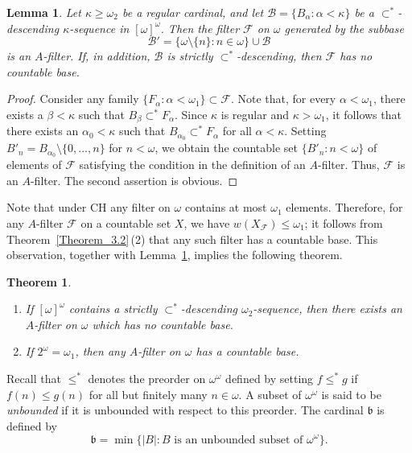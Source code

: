 \documentclass[a4paper,12pt]{amsart}
\newtheorem{theorem}{Theorem}[section]
\newtheorem{lemma}{Lemma}[section]
\theoremstyle{definition}
\theoremstyle{remark}
\begin{document}
\begin{lemma}
\label{Lemma_4.1}
Let $\kappa\ge \omega_2$ be a regular cardinal, and let $\mathscr B=\{B_\alpha: \alpha<\kappa\}$ 
be a $\subset^*$-descending $\kappa$-sequence in $[\omega]^\omega$. Then the filter $\mathscr F$ on 
$\omega$ generated by the subbase 
$$ 
\mathscr B' = \{\omega \setminus \{n\}: n\in\omega\}\cup \mathscr B
$$
is an $A$-filter. If, in addition, $\mathscr B$ is strictly $\subset^*$-descending, then $\mathscr F$ has no 
countable base. 
\end{lemma}

\begin{proof}
Consider any family $\{F_\alpha: 
\alpha<\omega_1\}\subset \mathscr F$. Note that, for every $\alpha<\omega_1$, there exists a $\beta<\kappa$ such 
that $B_\beta\subset^* F_\alpha$. Since $\kappa$ is regular and $\kappa>\omega_1$, it follows that there 
exists an $\alpha_0<\kappa$ such that $B_{\alpha_0}\subset^* F_\alpha$ for all $\alpha<\kappa$. Setting 
$B'_n=B_{\alpha_0}\setminus \{0,\dots, n\}$ for $n<\omega$, we obtain the countable set $\{B'_n: n<\omega\}$ of 
elements of $\mathscr F$ satisfying the condition in the definition of an $A$-filter. Thus, $\mathscr F$ is an 
$A$-filter. The second assertion is obvious. 
\end{proof}


Note that under $\mathrm{CH}$ any filter on $\omega$ contains at most $\omega_1$ elements. Therefore, for any 
$A$-filter $\mathscr F$ on a countable set $X$, we have $w(X_{\mathscr F})\le\omega_1$; it follows from 
Theorem~\ref{Theorem_3.2}\,(2) that any such filter has a countable base. This observation, together with Lemma~\ref{Lemma_4.1},  
implies the following theorem.

\begin{theorem}
\label{Theorem_4.1}
\begin{enumerate}
\item[\rm(1)]
If $[\omega]^\omega$ contains a strictly $\subset^*$-de\-scend\-ing $\omega_2$-sequence, then there exists an 
$A$-filter on $\omega$ which has no countable base. 
\item[\rm(2)] 
If $2^\omega=\omega_1$, then any $A$-filter on $\omega$ has a countable base. 
\end{enumerate} 
\end{theorem}

Recall that $\le^*$ denotes the preorder on $\omega^\omega$ defined by setting $f\le^* g$ if $f(n)\le g(n)$ for 
all but finitely many $n \in \omega$. A subset of $\omega^\omega$ is said to be \emph{unbounded} if it is 
unbounded with respect to this preorder. The cardinal $\mathfrak b$ is defined by
$$
\mathfrak b = \min\{|B|: \text{$B$ is an unbounded subset of $\omega^\omega$}\}.
$$
\end{document}
